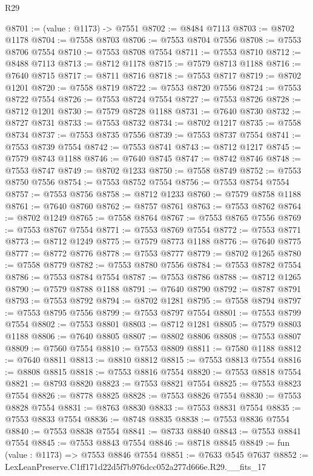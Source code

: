 \begin{lexlean}{R29}
\begin{coremodule}
@8701 := (value : @1173) -> @7551
@8702 := @8484 @7113
@8703 := @8702 @1178
@8704 := @7558 @8703
@8706 := @7553 @8704 @7556
@8708 := @7553 @8706 @7554
@8710 := @7553 @8708 @7554
@8711 := @7553 @8710
@8712 := @8488 @7113
@8713 := @8712 @1178
@8715 := @7579 @8713 @1188
@8716 := @7640 @8715
@8717 := @8711 @8716
@8718 := @7553 @8717
@8719 := @8702 @1201
@8720 := @7558 @8719
@8722 := @7553 @8720 @7556
@8724 := @7553 @8722 @7554
@8726 := @7553 @8724 @7554
@8727 := @7553 @8726
@8728 := @8712 @1201
@8730 := @7579 @8728 @1188
@8731 := @7640 @8730
@8732 := @8727 @8731
@8733 := @7553 @8732
@8734 := @8702 @1217
@8735 := @7558 @8734
@8737 := @7553 @8735 @7556
@8739 := @7553 @8737 @7554
@8741 := @7553 @8739 @7554
@8742 := @7553 @8741
@8743 := @8712 @1217
@8745 := @7579 @8743 @1188
@8746 := @7640 @8745
@8747 := @8742 @8746
@8748 := @7553 @8747
@8749 := @8702 @1233
@8750 := @7558 @8749
@8752 := @7553 @8750 @7556
@8754 := @7553 @8752 @7554
@8756 := @7553 @8754 @7554
@8757 := @7553 @8756
@8758 := @8712 @1233
@8760 := @7579 @8758 @1188
@8761 := @7640 @8760
@8762 := @8757 @8761
@8763 := @7553 @8762
@8764 := @8702 @1249
@8765 := @7558 @8764
@8767 := @7553 @8765 @7556
@8769 := @7553 @8767 @7554
@8771 := @7553 @8769 @7554
@8772 := @7553 @8771
@8773 := @8712 @1249
@8775 := @7579 @8773 @1188
@8776 := @7640 @8775
@8777 := @8772 @8776
@8778 := @7553 @8777
@8779 := @8702 @1265
@8780 := @7558 @8779
@8782 := @7553 @8780 @7556
@8784 := @7553 @8782 @7554
@8786 := @7553 @8784 @7554
@8787 := @7553 @8786
@8788 := @8712 @1265
@8790 := @7579 @8788 @1188
@8791 := @7640 @8790
@8792 := @8787 @8791
@8793 := @7553 @8792
@8794 := @8702 @1281
@8795 := @7558 @8794
@8797 := @7553 @8795 @7556
@8799 := @7553 @8797 @7554
@8801 := @7553 @8799 @7554
@8802 := @7553 @8801
@8803 := @8712 @1281
@8805 := @7579 @8803 @1188
@8806 := @7640 @8805
@8807 := @8802 @8806
@8808 := @7553 @8807
@8809 := @7560 @7554
@8810 := @7553 @8809
@8811 := @7580 @1188
@8812 := @7640 @8811
@8813 := @8810 @8812
@8815 := @7553 @8813 @7554
@8816 := @8808 @8815
@8818 := @7553 @8816 @7554
@8820 := @7553 @8818 @7554
@8821 := @8793 @8820
@8823 := @7553 @8821 @7554
@8825 := @7553 @8823 @7554
@8826 := @8778 @8825
@8828 := @7553 @8826 @7554
@8830 := @7553 @8828 @7554
@8831 := @8763 @8830
@8833 := @7553 @8831 @7554
@8835 := @7553 @8833 @7554
@8836 := @8748 @8835
@8838 := @7553 @8836 @7554
@8840 := @7553 @8838 @7554
@8841 := @8733 @8840
@8843 := @7553 @8841 @7554
@8845 := @7553 @8843 @7554
@8846 := @8718 @8845
@8849 := fun (value : @1173) => @7553 @8846 @7554
@8851 := @7633 @545 @7637
@8852 := LexLeanPreserve.C1ff171d22d5f7b976dcc052a277d666e.R29.__fits_17

\end{coremodule}
\end{lexlean}
